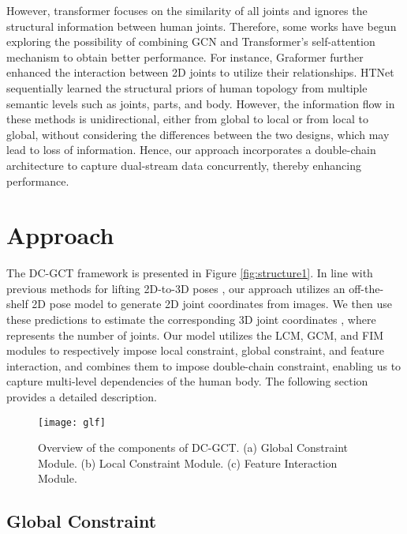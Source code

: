 \documentclass[journal]{IEEEtran}
\begin{document}
However, transformer focuses on the similarity of all joints and ignores the structural information between human joints. Therefore, some works have begun exploring the possibility of combining GCN and Transformer's self-attention mechanism to obtain better performance. For instance, Graformer \cite{zhao2022graformer} further enhanced the interaction between 2D joints to utilize their relationships. HTNet \cite{cai2023htnet} sequentially learned the structural priors of human topology from multiple semantic levels such as joints, parts, and body. However, the information flow in these methods is unidirectional, either from global to local or from local to global, without considering the differences between the two designs, which may lead to loss of information. Hence, our approach incorporates a double-chain architecture to capture dual-stream data concurrently, thereby enhancing performance.


\section{Approach}




The DC-GCT framework is presented in Figure \ref{fig:structure1}. In line with previous methods for lifting 2D-to-3D poses \cite{martinez2017simple,zhao2019semantic}, our approach utilizes an off-the-shelf 2D pose model to generate 2D joint coordinates  from images. We then use these predictions to estimate the corresponding 3D joint coordinates , where  represents the number of joints. Our model utilizes the LCM, GCM, and FIM modules to respectively impose local constraint, global constraint, and feature interaction, and combines them to impose double-chain constraint, enabling us to capture multi-level dependencies of the human body. The following section provides a detailed description.



\begin{figure}[t]
  \centering
  \texttt{[image: glf]}
  \caption{Overview of the components of DC-GCT. (a) Global Constraint Module. (b) Local Constraint Module.  (c) Feature Interaction Module.}
\label{fig:structure2}
\end{figure}



\subsection{Global Constraint}
\end{document}
